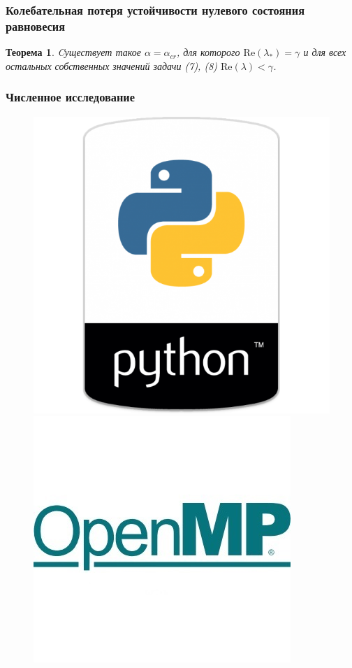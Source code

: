 \documentclass[fullscreen=true, unicode, bookmarks=false]{beamer}
\newtheorem{rustheorem}{Теорема }
\begin{document}
\begin{frame}
\frametitle{Колебательная потеря устойчивости нулевого состояния равновесия }
	
\begin{rustheorem}
Cуществует такое $ \alpha=\alpha_{cr} $, для которого $ \mbox{Re}(\lambda_{*}) = \gamma $ и для всех остальных собственных значений задачи (7), (8) $ \mbox{Re}(\lambda) < \gamma $. 
\end{rustheorem}

\end{frame}

\begin{frame}
\frametitle{ Численное исследование } 

\begin{figure} 
\includegraphics[scale=0.25]{python.png}  
\hfill
\includegraphics[scale=0.6]{openmp.jpg} 
\end{figure}

\end{frame}
\end{document}
